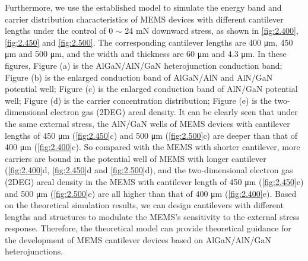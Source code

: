Furthermore, we use the established model to simulate the  energy band and  carrier distribution characteristics of  MEMS devices with different cantilever  lengths under the control of 0 $\sim$ 24 \unit{\mN} downward stress, as shown in \autoref{fig:2.400}, \autoref{fig:2.450} and \autoref{fig:2.500}. The corresponding cantilever  lengths are 400 \unit{\um}, 450 \unit{\um} and 500 \unit{\um}, and the width and thickness are 60 \unit{\um} and 4.3 \unit{\um}. In these figures, Figure (a) is the  AlGaN/AlN/GaN heterojunction  conduction band; Figure (b) is the enlarged conduction band  of AlGaN/AlN and AlN/GaN  potential well; Figure (c) is the enlarged conduction band of AlN/GaN potential  well; Figure (d) is the  carrier concentration distribution; Figure (e) is the two-dimensional electron gas (2DEG)  areal density. It can be clearly seen that under the same external stress, the AlN/GaN wells of  MEMS devices with cantilever  lengths of 450 \unit{\um} (\autoref{fig:2.450}c) and 500 \unit{\um} (\autoref{fig:2.500}c) are deeper than that of 400 \unit{\um} (\autoref{fig:2.400}c). So compared with the MEMS with shorter  cantilever, more carriers are bound in the potential well  of MEMS with longer cantilever  (\autoref{fig:2.400}d, \autoref{fig:2.450}d and \autoref{fig:2.500}d), and the two-dimensional electron gas (2DEG) areal density in the MEMS with cantilever length of 450 \unit{\um} (\autoref{fig:2.450}e) and 500 \unit{\um} (\autoref{fig:2.500}e) are all higher than that of  400 \unit{\um} (\autoref{fig:2.400}e). Based on the theoretical simulation results, we can design cantilevers  with different lengths and structures to modulate the MEMS's sensitivity to the external stress response. Therefore, the theoretical model can provide theoretical guidance for the development of MEMS cantilever  devices based on AlGaN/AlN/GaN heterojunctions.

